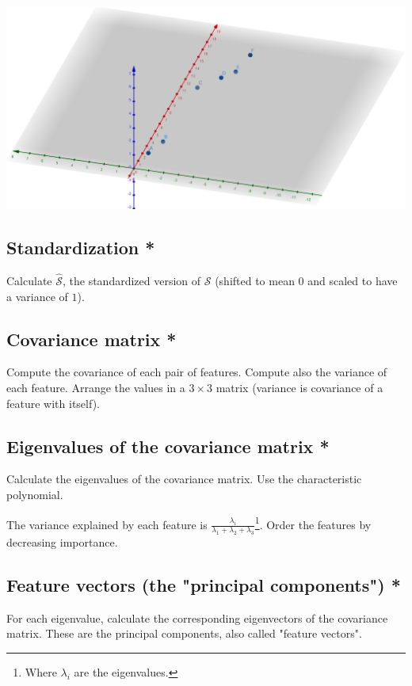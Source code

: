 \documentclass[]{article}
\begin{document}
	\begin{center}
		\vspace{0.2cm}
		\includegraphics[width=0.95\linewidth]{points}
		\vspace{0.2cm}
	\end{center}
	
	\subsection{Standardization *}
	Calculate $\hat{\mathcal{S}}$, the standardized version of $\mathcal{S}$ (shifted to mean $0$ and scaled to have a variance of $1$).
	
	\subsection{Covariance matrix *}
	Compute the covariance of each pair of features.
	Compute also the variance of each feature.
	Arrange the values in a $3 \times 3$ matrix (variance is covariance of a feature with itself).
	
	\subsection{Eigenvalues of the covariance matrix *}
	Calculate the eigenvalues of the covariance matrix.
	Use the characteristic polynomial.
	
	The variance explained by each feature is $\frac{\lambda_i}{\lambda_1+\lambda_2+\lambda_3}$\footnote{Where $\lambda_i$ are the eigenvalues.}.
	Order the features by decreasing importance.
	
	\subsection{Feature vectors (the "principal components") *}
	For each eigenvalue, calculate the corresponding eigenvectors of the covariance matrix.
	These are the principal components, also called "feature vectors".
	
\end{document}

